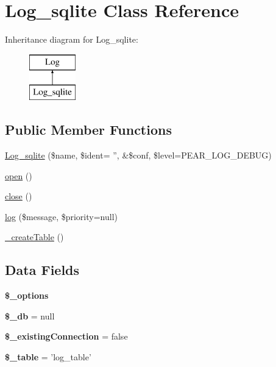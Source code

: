 \hypertarget{class_log__sqlite}{
\section{Log\_\-sqlite Class Reference}
\label{class_log__sqlite}
}
Inheritance diagram for Log\_\-sqlite:\begin{figure}[H]
\begin{center}
\leavevmode
\includegraphics[height=2.000000cm]{class_log__sqlite}
\end{center}
\end{figure}
\subsection*{Public Member Functions}
\begin{DoxyCompactItemize}
\item 
\hyperlink{class_log__sqlite_afb4f930e97cb7fb04ee2f3b6a5ff0f8e}{Log\_\-sqlite} (\$name, \$ident= '', \&\$conf, \$level=PEAR\_\-LOG\_\-DEBUG)
\item 
\hyperlink{class_log__sqlite_a44a2ac59a3b91f8c18905dce700934d6}{open} ()
\item 
\hyperlink{class_log__sqlite_aa69c8bf1f1dcf4e72552efff1fe3e87e}{close} ()
\item 
\hyperlink{class_log__sqlite_ac3758dfa38a67df158a446847cf06413}{log} (\$message, \$priority=null)
\item 
\hyperlink{class_log__sqlite_afd74c103c3222e079962fd416e071857}{\_\-createTable} ()
\end{DoxyCompactItemize}
\subsection*{Data Fields}
\begin{DoxyCompactItemize}
\item 
{\bfseries \$\_\-options}
\item 
\hypertarget{class_log__sqlite_abc686c23af6ae116b72bc6adb4482a1f}{
{\bfseries \$\_\-db} = null}
\label{class_log__sqlite_abc686c23af6ae116b72bc6adb4482a1f}

\item 
\hypertarget{class_log__sqlite_a367f16baa4347d6a379c16cdde44ab9b}{
{\bfseries \$\_\-existingConnection} = false}
\label{class_log__sqlite_a367f16baa4347d6a379c16cdde44ab9b}

\item 
\hypertarget{class_log__sqlite_ac0ee5b766d19cb282552a3449a1f8376}{
{\bfseries \$\_\-table} = 'log\_\-table'}
\label{class_log__sqlite_ac0ee5b766d19cb282552a3449a1f8376}

\end{DoxyCompactItemize}


